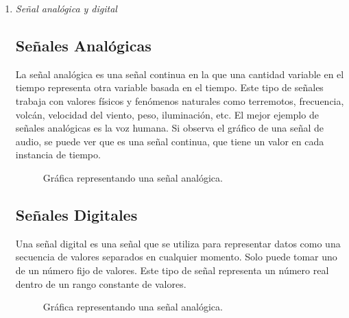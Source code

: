 
\begin{enumerate}
\item {\color{red}\textit{Señal analógica y digital}}

\subsection*{Señales Analógicas}
La señal analógica es una señal continua en la que una cantidad variable en el tiempo representa otra variable basada en el tiempo. Este tipo de señales trabaja con valores físicos y fenómenos naturales como terremotos, frecuencia, volcán, velocidad del viento, peso, iluminación, etc. El mejor ejemplo de señales analógicas es la voz humana. Si observa el gráfico de una señal de audio, se puede ver que es una señal continua, que tiene un valor en cada instancia de tiempo.

\begin{figure}[ht!]
\caption{Gráfica representando una señal analógica.}
\end{figure}

\subsection*{Señales Digitales}
Una señal digital es una señal que se utiliza para representar datos como una secuencia de valores separados en cualquier momento. Solo puede tomar uno de un número fijo de valores. Este tipo de señal representa un número real dentro de un rango constante de valores.


\begin{figure}[ht!]
\caption{Gráfica representando una señal analógica.}
\end{figure}


\end{enumerate}
